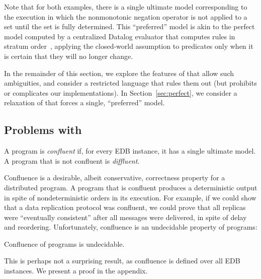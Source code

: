 Note that for both examples, there is a single ultimate model corresponding to
the execution in which the nonmonotonic negation operator is not applied to a
set until the set is fully determined.  This ``preferred'' model is akin to the
perfect model computed by a centralized Datalog evaluator that computes rules in
stratum order~\cite{ullman}, applying the closed-world assumption to predicates
only when it is certain that they will no longer change.

In the remainder of this section, we explore the features of \lang that allow
such ambiguities, and consider a restricted language \slang that rules them out
(but prohibits or complicates our implementations).  In
Section~\ref{sec:perfect}, we consider a relaxation of \slang that forces a
single, ``preferred'' model.

\subsection{Problems with \large \bf \lang}

\begin{definition}
  A \lang program is {\em confluent} if, for every EDB instance, it has a single ultimate model.  A program that is not confluent is {\em diffluent}.
\end{definition}


Confluence is a desirable, albeit conservative, correctness property for a distributed program.  A program that is
confluent produces a deterministic output in spite of nondeterministic orders in its execution.  For example, if
we could show that a data replication protocol was confluent, we could prove that all replicas were ``eventually consistent''
after all messages were delivered, in spite of delay and reordering.
Unfortunately, confluence is an undecidable property of \lang programs:

\begin{lemma}
\label{lem:confluence-undecidable}
Confluence of \lang programs is undecidable.
\end{lemma}
This is perhaps not a surprising result, as confluence is defined over all EDB instances.  We present a proof in the appendix.


